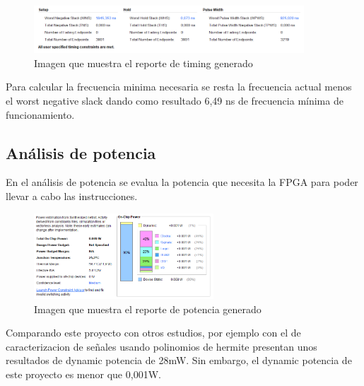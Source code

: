 	\begin{figure}[h!]
		\centering
		\includegraphics[width=0.9\textwidth]{./Images/img_res_experimentales/reportetiming.png}
		\caption{Imagen que muestra el reporte de timing generado}
		\label{fig:reporteTiming}
	\end{figure} 

	Para calcular la frecuencia minima necesaria se resta la frecuencia actual menos el worst negative slack dando como resultado 6,49 ns de frecuencia mínima de funcionamiento. 

\subsection{Análisis de potencia}

	En el análisis de potencia se evalua la potencia que necesita la FPGA para poder llevar a cabo las instrucciones.

	\begin{figure}[h!]
		\centering
		\includegraphics[width=0.6\textwidth]{./Images/img_res_experimentales/reportepower.png}
		\caption{Imagen que muestra el reporte de potencia generado}
		\label{fig:reportepotencia}
	\end{figure} 

	Comparando este proyecto con otros estudios, por ejemplo con el de caracterizacion de señales usando polinomios de hermite presentan unos resultados de dynamic potencia de 28mW.
	Sin embargo, el dynamic potencia de este proyecto es menor que 0,001W.








	